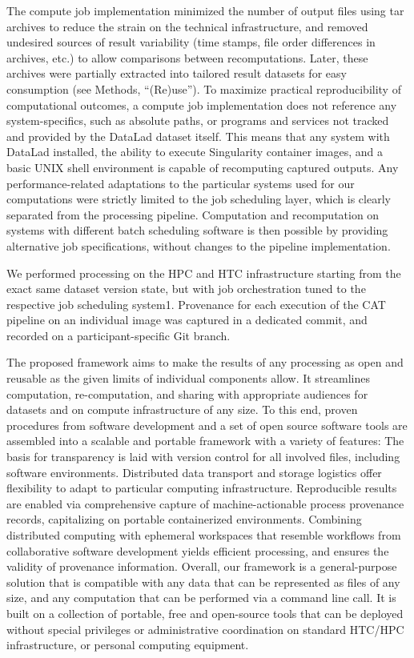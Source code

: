 The compute job implementation minimized the number of output files using tar archives to reduce the strain on the technical infrastructure, and removed undesired sources of result variability (time stamps, file order differences in archives, etc.) to allow comparisons between recomputations. Later, these archives were partially extracted into tailored result datasets for easy consumption (see Methods, “(Re)use”). To maximize practical reproducibility of computational outcomes, a compute job implementation does not reference any system-specifics, such as absolute paths, or programs and services not tracked and provided by the DataLad dataset itself. This means that any system with DataLad installed, the ability to execute Singularity container images, and a basic UNIX shell environment is capable of recomputing captured outputs. Any performance-related adaptations to the particular systems used for our computations were strictly limited to the job scheduling layer, which is clearly separated from the processing pipeline. Computation and recomputation on systems with different batch scheduling software is then possible by providing alternative job specifications, without changes to the pipeline implementation.

We performed processing on the HPC and HTC infrastructure starting from the exact same dataset version state, but with job orchestration tuned to the respective job scheduling system1. Provenance for each execution of the CAT pipeline on an individual image was captured in a dedicated commit, and recorded on a participant-specific Git branch.


The proposed framework aims to make the results of any processing as open and reusable as the given limits of individual components allow. It streamlines computation, re-computation, and sharing with appropriate audiences for datasets and on compute infrastructure of any size. To this end, proven procedures from software development and a set of open source software tools are assembled into a scalable and portable framework with a variety of features: The basis for transparency is laid with version control for all involved files, including software environments. Distributed data transport and storage logistics offer flexibility to adapt to particular computing infrastructure. Reproducible results are enabled via comprehensive capture of machine-actionable process provenance records, capitalizing on portable containerized environments. Combining distributed computing with ephemeral workspaces that resemble workflows from collaborative software development yields efficient processing, and ensures the validity of provenance information.
Overall, our framework is a general-purpose solution that is compatible with any data that can be represented as files of any size, and any computation that can be performed via a command line call. It is built on a collection of portable, free and open-source tools that can be deployed without special privileges or administrative coordination on standard HTC/HPC infrastructure, or personal computing equipment.

